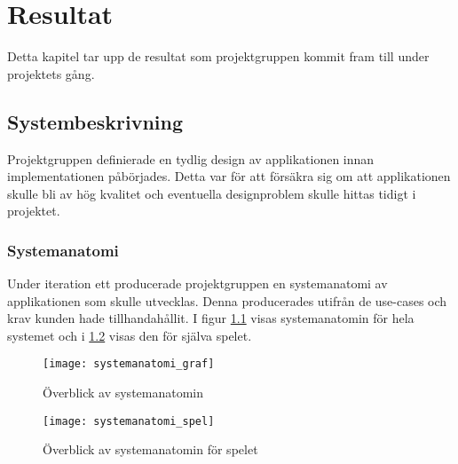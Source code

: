 
\chapter{Resultat}
\label{cha:results}

Detta kapitel tar upp de resultat som projektgruppen kommit fram till under projektets gång.

\section{Systembeskrivning}

Projektgruppen definierade en tydlig design av applikationen innan implementationen påbörjades. Detta var för att försäkra sig om att applikationen skulle bli av hög kvalitet och eventuella designproblem skulle hittas tidigt i projektet.

\subsection{Systemanatomi}
\label{beskrivning-systemanatomi}
Under iteration ett producerade projektgruppen en systemanatomi av applikationen som skulle utvecklas. Denna producerades utifrån de use-cases och krav kunden hade tillhandahållit. I figur \ref{fig:systemanatomi_graf} visas systemanatomin för hela systemet och i \ref{fig:systemanatomi_spel} visas den för själva spelet.

\begin{figure}[H]
    \centering
    \texttt{[image: systemanatomi\_graf]}
    \caption{Överblick av systemanatomin}
    \label{fig:systemanatomi_graf}
\end{figure}

\begin{figure}[H]
    \centering
    \texttt{[image: systemanatomi\_spel]}
    \caption{Överblick av systemanatomin för spelet}
    \label{fig:systemanatomi_spel}
\end{figure}



